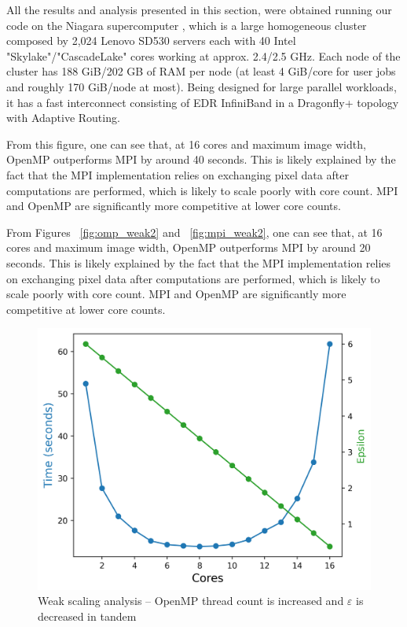 

All the results and analysis presented in this section, were obtained
running our code on the Niagara supercomputer \cite{10.1145/3332186.3332195},
which is a large homogeneous cluster composed by 2,024 Lenovo SD530 servers
each with 40 Intel "Skylake"/"CascadeLake" cores working at approx. 2.4/2.5 GHz.
Each node of the cluster has 188 GiB/202 GB of RAM per node (at least 4 GiB/core for user jobs and roughly 170 GiB/node at most).
Being designed for large parallel workloads, it has a fast interconnect consisting of EDR InfiniBand in a Dragonfly+ topology with Adaptive Routing.


From this figure,  one can see that, at 16 cores and maximum image width, OpenMP outperforms MPI by around 40 seconds. This is likely explained by the fact that the MPI implementation relies on exchanging pixel data after computations are performed, which is likely to scale poorly with core count. MPI and OpenMP are significantly more competitive at lower core counts.


From Figures ~\ref{fig:omp_weak2} and ~\ref{fig:mpi_weak2}, one can see that, at 16 cores and maximum image width, OpenMP outperforms MPI by around 20 seconds. This is likely explained by the fact that the MPI implementation relies on exchanging pixel data after computations are performed, which is likely to scale poorly with core count. MPI and OpenMP are significantly more competitive at lower core counts.


\begin{figure}[h]
  \centering
  \includegraphics[width=0.55\linewidth]{figs/omp_weak.out}
	\caption{Weak scaling analysis -- OpenMP thread count is increased and $\varepsilon$ is decreased in tandem}
    \label{fig:omp_weak}
\end{figure}

